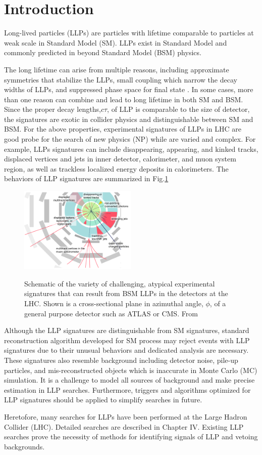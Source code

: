 \section{Introduction}
Long-lived particles (LLPs) are particles with lifetime comparable to particles at weak scale in Standard Model (SM). LLPs exist in Standard Model and commonly predicted in beyond Standard Model (BSM) physics. 

The long lifetime can arise from multiple reasons, including approximate symmetries that stabilize the LLPs, small coupling which narrow the decay widths of LLPs, and suppressed phase space for final state \cite{alimena2019searching}. In some cases, more than one reason can combine and lead to long lifetime in both SM and BSM. Since the proper decay lengths,$c\tau$, of LLP is comparable to the size of detector, the signatures are exotic in collider physics and distinguishable between SM and BSM. For the above properties, experimental signatures of LLPs in LHC are good probe for the search of new physics (NP) while are varied and complex. For example, LLPs signatures can include disappearing, appearing, and kinked tracks, displaced vertices and jets in inner detector, calorimeter, and muon system region, as well as trackless localized energy deposits in calorimeters. The behaviors of LLP signatures are summarized in Fig.\ref{fig:LLPsignature}

\begin{figure}[!h]
    \centering
    \caption{Schematic of the variety of challenging, atypical experimental signatures that can result from BSM LLPs in the detectors at the LHC. Shown is a cross-sectional plane in azimuthal angle, $\phi$, of a general purpose detector such as ATLAS or CMS. From \cite{russell2017llp}}
    \includegraphics[width=0.5\textwidth]{fig/LLPSignature.png}
    \label{fig:LLPsignature}
\end{figure}

Although the LLP signatures are distinguishable from SM signatures, standard reconstruction algorithm developed for SM process may reject events with LLP signatures due to their unusual behaviors and dedicated analysis are necessary. These signatures also resemble background including detector noise, pile-up particles, and mis-reconstructed objects which is inaccurate in  Monte Carlo (MC) simulation. It is a challenge to model all sources of background and  make precise estimation in LLP searches. Furthermore, triggers and algorithms optimized for LLP signatures should be applied to simplify searches in future.

Heretofore, many searches for LLPs have been performed at the Large Hadron Collider (LHC). Detailed searches are described in Chapter IV. Existing LLP searches prove the necessity of methods for identifying signals of LLP and vetoing backgrounds. 